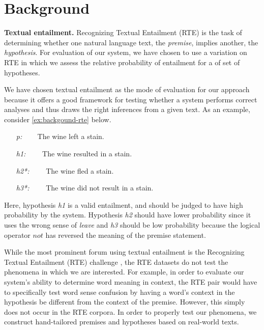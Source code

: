 \section{Background}

\textbf{Textual entailment.}
Recognizing Textual Entailment (RTE) is the task of determining whether one
natural language text, the {\it premise}, implies another, the {\it hypothesis}.
For evaluation of our system, we have chosen to use a variation on RTE in which
we assess the relative probability of entailment for a of set of hypotheses.

We have chosen textual entailment as the mode of evaluation
for our approach because it offers a good framework for testing whether a system
performs correct analyses and thus draws the right inferences from a given text.
As an example, consider \eqref{ex:backgound-rte} below.    
\begin{covex}\label{ex:backgound-rte}
\begin{itemize} \itemsep -3pt
  \item[{\it p:}]~~~    The wine left a stain.
  \item[{\it h1:}]~~~~The wine resulted in a stain.
  \item[{\it h2*:}]~~~~The wine fled a stain.
  \item[{\it h3*:}]~~~~The wine did not result in a stain.
\end{itemize}
\end{covex}
Here, hypothesis {\it h1} is a valid entailment, and should be judged to have
high probability by the system.  Hypothesis {\it h2} should have lower probability since
it uses the wrong sense of {\it leave} and {\it h3} should be low probability
because the logical operator $not$ has reversed the meaning of the premise
statement.

While the most prominent forum using textual entailment is the Recognizing
Textual Entailment (RTE) challenge \citep{dagan:rte2005}, the RTE datasets do
not test the phenomena in which we are interested. For example, in order to
evaluate our system's ability to determine word meaning in context, the RTE pair
would have to specifically test word sense confusion by having a word's context
in the hypothesis be different from the context of the premise.  However, this
simply does not occur in the RTE corpora.  In order to properly test our
phenomena, we construct hand-tailored premises and hypotheses based on
real-world texts.


